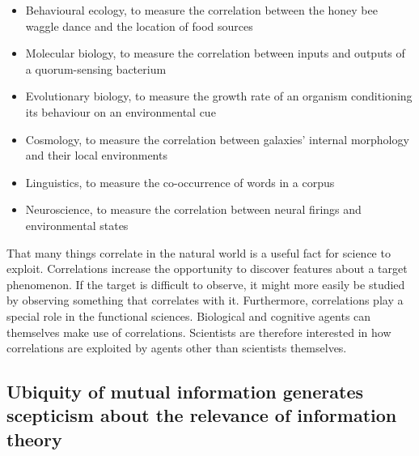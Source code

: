 \begin{itemize}
    \item Behavioural ecology, to measure the correlation between the honey bee waggle dance and the location of food sources \citep{haldane1954statistical}
    \item Molecular biology, to measure the correlation between inputs and outputs of a quorum-sensing bacterium \citep{mehta2009information}
    \item Evolutionary biology, to measure the growth rate of an organism conditioning its behaviour on an environmental cue \citep{donaldson-matasci2010fitness}
    \item Cosmology, to measure the correlation between galaxies' internal morphology and their local environments \citep{pandey2017how}
    \item Linguistics, to measure the co-occurrence of words in a corpus \citep[$\S$4]{hunston2002corpora}
    \item Neuroscience, to measure the correlation between neural firings and environmental states \citep[][and references therein]{rathkopf2017neural}
\end{itemize}

\noindent That many things correlate in the natural world is a useful fact for science to exploit.
Correlations increase the opportunity to discover features about a target phenomenon.
If the target is difficult to observe, it might more easily be studied by observing something that correlates with it. 
Furthermore, correlations play a special role in the functional sciences.
Biological and cognitive agents can themselves make use of correlations.
Scientists are therefore interested in how correlations are exploited by agents other than scientists themselves.

\subsection{Ubiquity of mutual information generates scepticism about the relevance of information theory}

